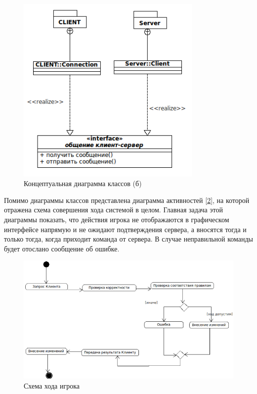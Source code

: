 \begin{figure}[ht]
\centering
\includegraphics[width=9cm]{images/class1.png}
\caption{Концептуальная диаграмма классов (б)}
\label{fig2}
\end{figure}

Помимо диаграммы классов представлена диаграмма активностей [\ref{fig}], на которой отражена схема совершения хода системой в целом. Главная задача этой диаграммы показать, что действия игрока не отображаются в графическом интерфейсе напрямую и не ожидают подтверждения сервера, а вносятся тогда и только тогда, когда приходит команда от сервера. В случае неправильной команды будет отослано сообщение об ошибке. 

\begin{figure}[ht]
\centering
\includegraphics[width=15cm]{images/activitygen.png}
\caption{Схема хода игрока}
\label{fig}
\end{figure}


\endinput
